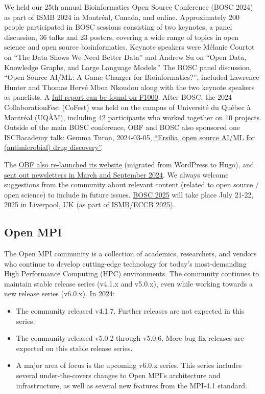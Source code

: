\documentclass[a4paper]{report}
\begin{document}
We held our 25th annual Bioinformatics Open Source Conference (BOSC 2024) as part of ISMB 2024 in Montréal, Canada, and online. Approximately 200 people participated in BOSC sessions consisting of two keynotes, a panel discussion, 36 talks and 23 posters, covering a wide range of topics in open science and open source bioinformatics. Keynote speakers were Mélanie Courtot on ``The Data Shows We Need Better Data'' and Andrew Su on ``Open Data, Knowledge Graphs, and Large Language Models.'' The BOSC panel discussion, ``Open Source AI/ML: A Game Changer for Bioinformatics?'', included Lawrence Hunter and Thomas Hervé Mboa Nkoudou along with the two keynote speakers as panelists. A \href{https://f1000research.com/articles/13-1100}{full report can be found on F1000}. After BOSC, the 2024 CollaborationFest (CoFest) was held on the campus of Université du Québec à Montréal (UQÀM), including 42 participants who worked together on 10 projects. Outside of the main BOSC conference, OBF and BOSC also sponsored one ISCBacademy talk: Gemma Turon, 2024-03-05, \href{https://www.open-bio.org/2024/03/26/gemma-turon-iscbacademy-talk-video/}{“Ersilia, open source AI/ML for (antimicrobial) drug discovery”}.

The \href{https://www.open-bio.org/}{OBF also re-launched its website} (migrated from WordPress to Hugo), and \href{https://github.com/OBF/newsletter/tree/master/newsletters}{sent out newsletters in March and September 2024}. We always welcome suggestions from the community about relevant content (related to open source / open science) to include in future issues.
\href{https://www.open-bio.org/events/bosc-2025/}{BOSC 2025} will take place July 21-22, 2025 in Liverpool, UK (as part of \href{https://www.iscb.org/ismbeccb2025/home}{ISMB/ECCB 2025}).

\subsection{Open MPI}

The Open MPI community is a collection of academics, researchers, and vendors who continue to develop cutting-edge technology for today’s most-demanding High Performance Computing (HPC) environments.  The community continues to maintain stable release series (v4.1.x and v5.0.x), even while working towards a new release series (v6.0.x).
In 2024:

\begin{itemize}

\item The community released v4.1.7. Further releases are not expected in this series.

\item The community released v5.0.2 through v5.0.6.  More bug-fix releases are expected on this stable release series.

\item A major area of focus is the upcoming v6.0.x series. This series includes several under-the-covers changes to Open MPI’s architecture and infrastructure, as well as several new features from the MPI-4.1 standard.

\end{itemize}
\end{document}
